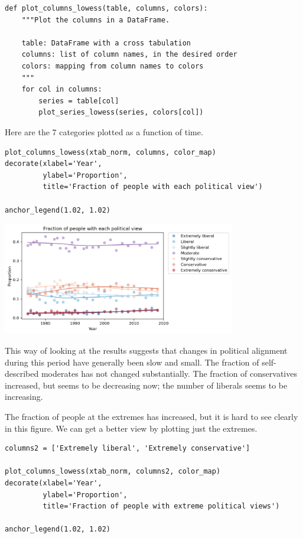 \begin{lstlisting}[]
def plot_columns_lowess(table, columns, colors):
    """Plot the columns in a DataFrame.
    
    table: DataFrame with a cross tabulation
    columns: list of column names, in the desired order
    colors: mapping from column names to colors
    """
    for col in columns:
        series = table[col]
        plot_series_lowess(series, colors[col])
\end{lstlisting}

Here are the 7 categories plotted as a function of time.

\begin{lstlisting}[]
plot_columns_lowess(xtab_norm, columns, color_map)
decorate(xlabel='Year',
         ylabel='Proportion',
         title='Fraction of people with each political view')

anchor_legend(1.02, 1.02)
\end{lstlisting}

\begin{center}
\includegraphics[width=4in]{chapters/02_polviews_soln_files/02_polviews_soln_91_0.png}
\end{center}

This way of looking at the results suggests that changes in political
alignment during this period have generally been slow and small. The
fraction of self-described moderates has not changed substantially. The
fraction of conservatives increased, but seems to be decreasing now; the
number of liberals seems to be increasing.

The fraction of people at the extremes has increased, but it is hard to
see clearly in this figure. We can get a better view by plotting just
the extremes.

\begin{lstlisting}[]
columns2 = ['Extremely liberal', 'Extremely conservative']

plot_columns_lowess(xtab_norm, columns2, color_map)
decorate(xlabel='Year',
         ylabel='Proportion',
         title='Fraction of people with extreme political views')

anchor_legend(1.02, 1.02)
\end{lstlisting}

